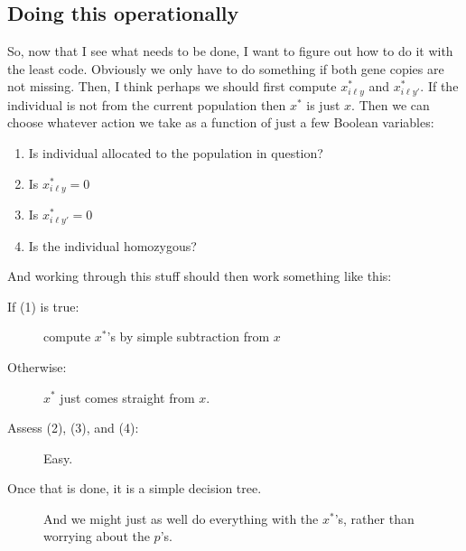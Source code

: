 \documentclass[11pt]{article}
\begin{document}
\subsection{Doing this operationally}

So, now that I see what needs to be done, I want to figure out how to do it with the least code.  
Obviously we only have to do something if both gene copies are not missing.  Then, I think
perhaps we should first compute $x^*_{i\ell y}$ and $x^*_{i\ell y'}$.  If the individual is not from the 
current population then $x^*$ is just $x$.  Then we can choose 
whatever action we take as a function of just a few Boolean
variables:
\begin{enumerate}
\item Is individual allocated to the population in question?
\item Is $x^*_{i\ell y} = 0$
\item Is $x^*_{i\ell y'} = 0$
\item Is the individual homozygous?
\end{enumerate}

And working through this stuff should then work something like this:
\begin{description}
\item [If (1) is true:] compute $x^*$'s by simple subtraction from $x$
\item [Otherwise:] $x^*$ just comes straight from $x$.
\item [Assess (2), (3), and (4):] Easy.
\item [Once that is done, it is a simple decision tree. ]  And we might just as well do everything with the $x^*$'s, rather than worrying
about the $p$'s.
\end{description}



 
\end{document}
